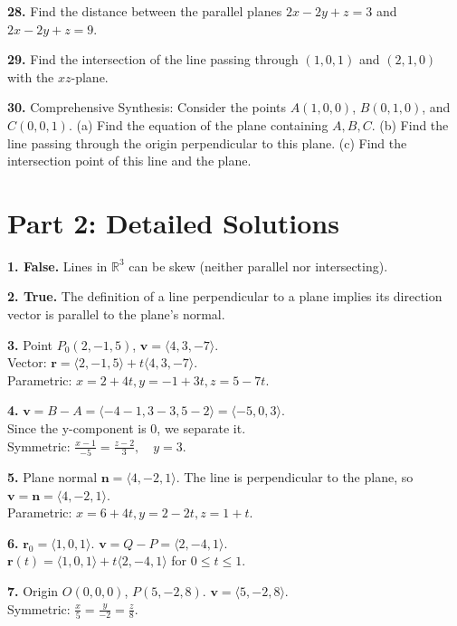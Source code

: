 \documentclass[12pt]{article}
\begin{document}
\textbf{28.} Find the distance between the parallel planes $2x - 2y + z = 3$ and $2x - 2y + z = 9$.

\textbf{29.} Find the intersection of the line passing through $(1,0,1)$ and $(2,1,0)$ with the $xz$-plane.

\textbf{30.} Comprehensive Synthesis: 
Consider the points $A(1,0,0)$, $B(0,1,0)$, and $C(0,0,1)$.
(a) Find the equation of the plane containing $A, B, C$.
(b) Find the line passing through the origin perpendicular to this plane.
(c) Find the intersection point of this line and the plane.

\newpage
\section*{Part 2: Detailed Solutions}

\textbf{1. False.} Lines in $\mathbb{R}^3$ can be skew (neither parallel nor intersecting).

\textbf{2. True.} The definition of a line perpendicular to a plane implies its direction vector is parallel to the plane's normal.

\textbf{3.} 
Point $P_0(2, -1, 5)$, $\mathbf{v} = \langle 4, 3, -7 \rangle$. \\
Vector: $\mathbf{r} = \langle 2, -1, 5 \rangle + t\langle 4, 3, -7 \rangle$. \\
Parametric: $x = 2 + 4t, y = -1 + 3t, z = 5 - 7t$.

\textbf{4.} 
$\mathbf{v} = B - A = \langle -4-1, 3-3, 5-2 \rangle = \langle -5, 0, 3 \rangle$. \\
Since the y-component is 0, we separate it. \\
Symmetric: $\frac{x-1}{-5} = \frac{z-2}{3}, \quad y = 3$.

\textbf{5.} 
Plane normal $\mathbf{n} = \langle 4, -2, 1 \rangle$. The line is perpendicular to the plane, so $\mathbf{v} = \mathbf{n} = \langle 4, -2, 1 \rangle$. \\
Parametric: $x = 6 + 4t, y = 2 - 2t, z = 1 + t$.

\textbf{6.} 
$\mathbf{r}_0 = \langle 1, 0, 1 \rangle$. $\mathbf{v} = Q - P = \langle 2, -4, 1 \rangle$. \\
$\mathbf{r}(t) = \langle 1, 0, 1 \rangle + t\langle 2, -4, 1 \rangle$ for $0 \le t \le 1$.

\textbf{7.} 
Origin $O(0,0,0)$, $P(5,-2,8)$. $\mathbf{v} = \langle 5, -2, 8 \rangle$. \\
Symmetric: $\frac{x}{5} = \frac{y}{-2} = \frac{z}{8}$.
\end{document}
